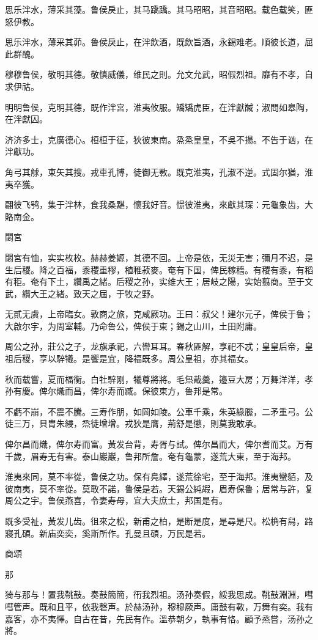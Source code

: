 思乐泮水，薄采其藻。鲁侯戾止，其马蹻蹻。其马昭昭，其音昭昭。载色载笑，匪怒伊教。

思乐泮水，薄采其茆。鲁侯戾止，在泮飲酒，既飲旨酒，永錫难老。順彼长道，屈此群醜。

穆穆鲁侯，敬明其德。敬慎威儀，维民之則。允文允武，昭假烈祖。靡有不孝，自求伊祜。

明明鲁侯，克明其德，既作泮宮，淮夷攸服。矯矯虎臣，在泮獻馘；淑問如皋陶，在泮獻囚。

济济多士，克廣德心。桓桓于征，狄彼東南。烝烝皇皇，不吳不揚。不告于讻，在泮獻功。

角弓其觩，束矢其搜。戎車孔博，徒御无斁。既克淮夷，孔淑不逆。式固尔猶，淮夷卒獲。

翩彼飞鸮，集于泮林，食我桑黮，懷我好音。憬彼淮夷，來獻其琛：元龜象齿，大賂南金。

閟宮

閟宮有恤，实实枚枚。赫赫姜嫄，其德不回。上帝是依，无災无害；彌月不迟，是生后稷。降之百福，黍稷重穋，稙稚菽麥。奄有下国，俾民稼穡。有稷有黍，有稻有秬。奄有下土，纘禹之緒。后稷之孙，实维大王；居岐之陽，实始翦商。至于文武，纘大王之緒。致天之屆，于牧之野。

无貳无虞，上帝臨女。敦商之旅，克咸厥功。王曰：叔父！建尔元子，俾侯于鲁；大啟尔宇，为周室輔。乃命鲁公，俾侯于東；錫之山川，土田附庸。

周公之孙，莊公之子，龙旗承祀，六轡耳耳。春秋匪解，享祀不忒；皇皇后帝，皇祖后稷，享以騂犧。是饗是宜，降福既多。周公皇祖，亦其福女。

秋而载嘗，夏而楅衡。白牡騂刚，犧尊將將。毛炰胾羹，籩豆大房；万舞洋洋，孝孙有慶。俾尔熾而昌，俾尔寿而臧。保彼東方，鲁邦是常。

不虧不崩，不震不騰。三寿作朋，如岡如陵。公車千乘，朱英綠縢，二矛重弓。公徒三万，貝胄朱綅，烝徒增增。戎狄是膺，荊舒是懲，則莫我敢承。

俾尔昌而熾，俾尔寿而富。黃发台背，寿胥与試。俾尔昌而大，俾尔耆而艾。万有千歲，眉寿无有害。泰山巖巖，鲁邦所詹。奄有龜蒙，遂荒大東，至于海邦。

淮夷來同，莫不率從，鲁侯之功。保有鳧繹，遂荒徐宅，至于海邦。淮夷蠻貊，及彼南夷，莫不率從。莫敢不諾，鲁侯是若。天錫公純嘏，眉寿保鲁；居常与許，复周公之宇。鲁侯燕喜，令妻寿母，宜大夫庶士，邦国是有。

既多受祉，黃发儿齿。徂來之松，新甫之柏，是断是度，是尋是尺。松桷有舄，路寢孔碩。新庙奕奕，奚斯所作。孔曼且碩，万民是若。




商頌


那

猗与那与！置我鞉鼓。奏鼓簡簡，衎我烈祖。汤孙奏假，綏我思成。鞉鼓淵淵，嘒嘒管声。既和且平，依我磬声。於赫汤孙，穆穆厥声。庸鼓有斁，万舞有奕。我有嘉客，亦不夷懌。自古在昔，先民有作。溫恭朝夕，執事有恪。顧予烝嘗，汤孙之將。

